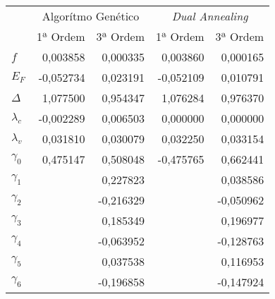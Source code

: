 \begin{tabular}{lrrrr}
\toprule
{} & \multicolumn{2}{c}{Algorítmo Genético} & \multicolumn{2}{c}{\textit{Dual Annealing}} \\
{} &           1ª Ordem &  3ª Ordem &                1ª Ordem &  3ª Ordem \\
\midrule
$f$         &           0,003858 &  0,000335 &                0,003860 &  0,000165 \\
$E_F$       &          -0,052734 &  0,023191 &               -0,052109 &  0,010791 \\
$\Delta$    &           1,077500 &  0,954347 &                1,076284 &  0,976370 \\
$\lambda_c$ &          -0,002289 &  0,006503 &                0,000000 &  0,000000 \\
$\lambda_v$ &           0,031810 &  0,030079 &                0,032250 &  0,033154 \\
$\gamma_0$  &           0,475147 &  0,508048 &               -0,475765 &  0,662441 \\
$\gamma_1$  &                    &  0,227823 &                         &  0,038586 \\
$\gamma_2$  &                    & -0,216329 &                         & -0,050962 \\
$\gamma_3$  &                    &  0,185349 &                         &  0,196977 \\
$\gamma_4$  &                    & -0,063952 &                         & -0,128763 \\
$\gamma_5$  &                    &  0,037538 &                         &  0,116953 \\
$\gamma_6$  &                    & -0,196858 &                         & -0,147924 \\
\bottomrule
\end{tabular}

